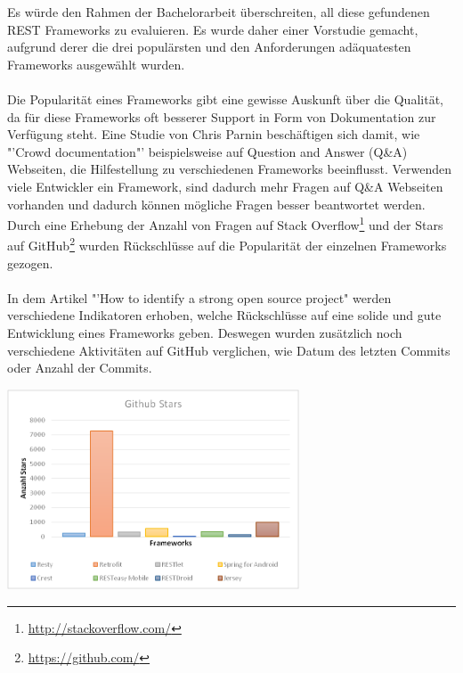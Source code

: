 Es würde den Rahmen der Bachelorarbeit überschreiten, all diese gefundenen REST Frameworks zu evaluieren. Es wurde daher einer Vorstudie gemacht, aufgrund derer die drei populärsten und den Anforderungen adäquatesten Frameworks ausgewählt wurden.
\\\\
Die Popularität eines Frameworks gibt eine gewisse Auskunft über die Qualität, da für diese Frameworks oft besserer Support in Form von Dokumentation zur Verfügung steht. Eine Studie von Chris Parnin\cite{parnin2012crowd} beschäftigen sich damit, wie "'Crowd documentation"' beispielsweise auf Question and Answer (Q\&A) Webseiten, die Hilfestellung zu verschiedenen Frameworks beeinflusst. Verwenden viele Entwickler ein Framework, sind dadurch mehr Fragen auf Q\&A Webseiten vorhanden und dadurch können mögliche Fragen besser beantwortet werden. Durch eine Erhebung der Anzahl von Fragen auf Stack Overflow\footnote{\href{http://stackoverflow.com/}{http://stackoverflow.com/}} und der Stars auf GitHub\footnote{\href{https://github.com/}{https://github.com/}} wurden Rückschlüsse auf die Popularität der einzelnen Frameworks gezogen.  
\\\\
In dem Artikel "'How to identify a strong open source project"\cite{balter:strongOS} werden verschiedene Indikatoren erhoben, welche Rückschlüsse auf eine solide und gute Entwicklung eines Frameworks geben. Deswegen wurden zusätzlich noch verschiedene Aktivitäten auf GitHub verglichen, wie Datum des letzten Commits oder Anzahl der Commits.

\begin{minipage}{\textwidth} 
	\centering	
	\includegraphics[width=0.65\textwidth]{figures/github_stars.png}
	\label{figure:githubStars}
	\vspace{2ex}
\end{minipage}

